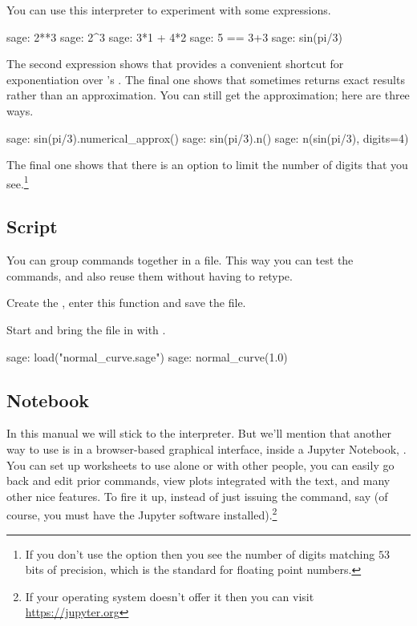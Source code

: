 You can use this interpreter to experiment with some expressions.
\begin{sagecommandline}
sage: 2**3                                                                      
sage: 2^3
sage: 3*1 + 4*2
sage: 5 == 3+3
sage: sin(pi/3)
\end{sagecommandline}
The second expression 
shows that \Sage{} provides a convenient shortcut for exponentiation over
\python's .
The final one
shows that \Sage{} sometimes returns exact results rather than an
approximation.
You can still get the approximation; here are three ways.
\begin{sagecommandline}
sage: sin(pi/3).numerical_approx()
sage: sin(pi/3).n()
sage: n(sin(pi/3), digits=4)  
\end{sagecommandline}
The final one shows that there is an option to limit the number of digits
that you see.\footnote{%
  If you don't use the option then you see the number of digits matching 
  $53$ bits of precision, which is the standard for  
  floating point numbers.}


\subsection{Script}
You can group \Sage{} commands together in a file.
This way you can test the commands, 
and also reuse them without having to retype.

Create the , 
enter this function and save the file.

Start \Sage{} and bring the file in with .
\begin{sagecommandline}
sage: load("normal_curve.sage")
sage: normal_curve(1.0)
\end{sagecommandline}


\subsection{Notebook}
In this manual we will stick to the interpreter.
But we'll mention that another way to use \Sage{} is in   
a browser-based graphical interface, 
inside a Jupyter Notebook, \cite{JupyterTeam19}.
You can set up
worksheets to use alone or with other people, you can easily
go back and edit prior commands, view plots integrated with the text, 
and many other nice features.
To fire it up, instead of just issuing the 
command, say
(of course, you must have the Jupyter software
installed).\footnote{%
  If your operating system doesn't offer it then you can 
  visit \protect\url{https://jupyter.org}}
\endinput
